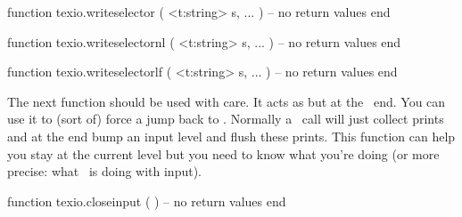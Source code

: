 \starttyping[option=LUA]
function texio.writeselector ( <t:string> s, ... )
    -- no return values
end

function texio.writeselectornl ( <t:string> s, ... )
    -- no return values
end

function texio.writeselectorlf ( <t:string> s, ... )
    -- no return values
end
\stoptyping

The next function should be used with care. It acts as \type {\endinput} but at
the \LUA\ end. You can use it to (sort of) force a jump back to \TEX. Normally a
\LUA\ call will just collect prints and at the end bump an input level and flush
these prints. This function can help you stay at the current level but you need
to know what you're doing (or more precise: what \TEX\ is doing with input).

\starttyping[option=LUA]
function texio.closeinput ( )
    -- no return values
end
\stoptyping

%

\stopsubsection

\stopsection

\stopdocument

